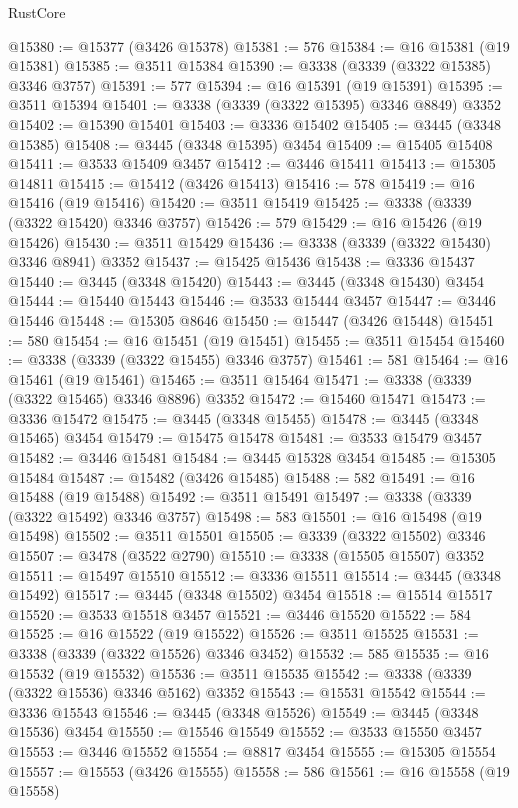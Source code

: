 \begin{lexlean}{RustCore}
\begin{coremodule}
@15380 := @15377 (@3426 @15378)
@15381 := 576
@15384 := @16 @15381 (@19 @15381)
@15385 := @3511 @15384
@15390 := @3338 (@3339 (@3322 @15385) @3346 @3757)
@15391 := 577
@15394 := @16 @15391 (@19 @15391)
@15395 := @3511 @15394
@15401 := @3338 (@3339 (@3322 @15395) @3346 @8849) @3352
@15402 := @15390 @15401
@15403 := @3336 @15402
@15405 := @3445 (@3348 @15385)
@15408 := @3445 (@3348 @15395) @3454
@15409 := @15405 @15408
@15411 := @3533 @15409 @3457
@15412 := @3446 @15411
@15413 := @15305 @14811
@15415 := @15412 (@3426 @15413)
@15416 := 578
@15419 := @16 @15416 (@19 @15416)
@15420 := @3511 @15419
@15425 := @3338 (@3339 (@3322 @15420) @3346 @3757)
@15426 := 579
@15429 := @16 @15426 (@19 @15426)
@15430 := @3511 @15429
@15436 := @3338 (@3339 (@3322 @15430) @3346 @8941) @3352
@15437 := @15425 @15436
@15438 := @3336 @15437
@15440 := @3445 (@3348 @15420)
@15443 := @3445 (@3348 @15430) @3454
@15444 := @15440 @15443
@15446 := @3533 @15444 @3457
@15447 := @3446 @15446
@15448 := @15305 @8646
@15450 := @15447 (@3426 @15448)
@15451 := 580
@15454 := @16 @15451 (@19 @15451)
@15455 := @3511 @15454
@15460 := @3338 (@3339 (@3322 @15455) @3346 @3757)
@15461 := 581
@15464 := @16 @15461 (@19 @15461)
@15465 := @3511 @15464
@15471 := @3338 (@3339 (@3322 @15465) @3346 @8896) @3352
@15472 := @15460 @15471
@15473 := @3336 @15472
@15475 := @3445 (@3348 @15455)
@15478 := @3445 (@3348 @15465) @3454
@15479 := @15475 @15478
@15481 := @3533 @15479 @3457
@15482 := @3446 @15481
@15484 := @3445 @15328 @3454
@15485 := @15305 @15484
@15487 := @15482 (@3426 @15485)
@15488 := 582
@15491 := @16 @15488 (@19 @15488)
@15492 := @3511 @15491
@15497 := @3338 (@3339 (@3322 @15492) @3346 @3757)
@15498 := 583
@15501 := @16 @15498 (@19 @15498)
@15502 := @3511 @15501
@15505 := @3339 (@3322 @15502) @3346
@15507 := @3478 (@3522 @2790)
@15510 := @3338 (@15505 @15507) @3352
@15511 := @15497 @15510
@15512 := @3336 @15511
@15514 := @3445 (@3348 @15492)
@15517 := @3445 (@3348 @15502) @3454
@15518 := @15514 @15517
@15520 := @3533 @15518 @3457
@15521 := @3446 @15520
@15522 := 584
@15525 := @16 @15522 (@19 @15522)
@15526 := @3511 @15525
@15531 := @3338 (@3339 (@3322 @15526) @3346 @3452)
@15532 := 585
@15535 := @16 @15532 (@19 @15532)
@15536 := @3511 @15535
@15542 := @3338 (@3339 (@3322 @15536) @3346 @5162) @3352
@15543 := @15531 @15542
@15544 := @3336 @15543
@15546 := @3445 (@3348 @15526)
@15549 := @3445 (@3348 @15536) @3454
@15550 := @15546 @15549
@15552 := @3533 @15550 @3457
@15553 := @3446 @15552
@15554 := @8817 @3454
@15555 := @15305 @15554
@15557 := @15553 (@3426 @15555)
@15558 := 586
@15561 := @16 @15558 (@19 @15558)

\end{coremodule}
\end{lexlean}
